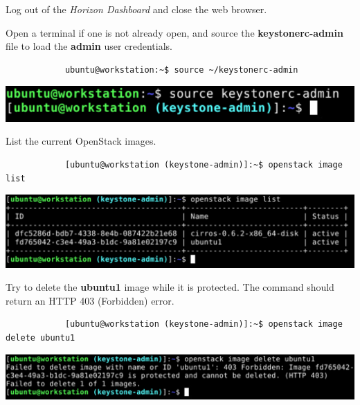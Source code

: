 \documentclass[letterpaper, 12pt]{article}
\begin{document}
\begin{enumerate}
    \begin{labstep}
        Log out of the \textit{Horizon Dashboard} and close the web browser.
    \end{labstep}

    \begin{labstep}
        Open a terminal if one is not already open, and source the \textbf{keystonerc-admin} file to load the \textbf{admin} user credentials.
        \begin{lstlisting}
            ubuntu@workstation:~$ source ~/keystonerc-admin
        \end{lstlisting}

        \begin{center}
            \includegraphics[width=\linewidth]{images/part1/step13.png}
        \end{center}
    \end{labstep}

    \begin{labstep}
        List the current OpenStack images.
        \begin{lstlisting}
            [ubuntu@workstation (keystone-admin)]:~$ openstack image list
        \end{lstlisting}

        \begin{center}
            \includegraphics[width=\linewidth]{images/part1/step14.png}
        \end{center}
    \end{labstep}

    \begin{labstep}
        Try to delete the \textbf{ubuntu1} image while it is protected.
        The command should return an HTTP 403 (Forbidden) error.
        \begin{lstlisting}
            [ubuntu@workstation (keystone-admin)]:~$ openstack image delete ubuntu1
        \end{lstlisting}

        \begin{center}
            \includegraphics[width=\linewidth]{images/part1/step15.png}
        \end{center}
    \end{labstep}


\end{enumerate}
\end{document}
